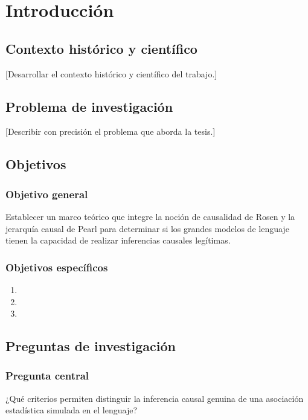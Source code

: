 \chapter{Introducción}

\section{Contexto histórico y científico}
[Desarrollar el contexto histórico y científico del trabajo.]

\section{Problema de investigación}
[Describir con precisión el problema que aborda la tesis.]

\section{Objetivos}
\subsection{Objetivo general}
Establecer un marco teórico que integre la noción de causalidad de Rosen y la jerarquía causal de Pearl para determinar si los grandes modelos de lenguaje tienen la capacidad de realizar inferencias causales legítimas.

\subsection{Objetivos específicos}
\begin{enumerate}[align=left]
  \item [Objetivo específico 1]
  \item [Objetivo específico 2]
  \item [Objetivo específico 3]
\end{enumerate}

\section{Preguntas de investigación}
\subsection{Pregunta central}
¿Qué criterios permiten distinguir la inferencia causal genuina de una asociación estadística simulada en el lenguaje?

